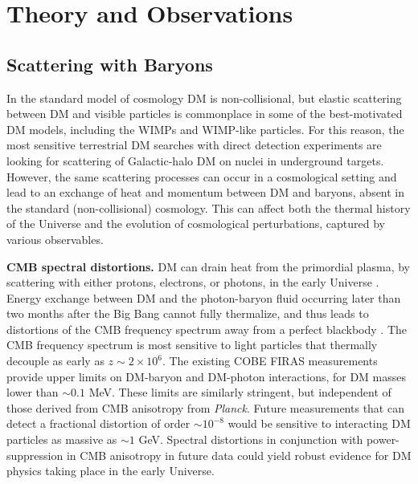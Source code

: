 \documentclass[12pt]{article}
\begin{document}
\section{Theory and Observations}
\label{sec:thobs}
\subsection{Scattering with Baryons}

In the standard model of cosmology DM is non-collisional, but elastic scattering between DM and visible particles is commonplace in some of the best-motivated DM models, including the WIMPs and WIMP-like particles.
For this reason, the most sensitive terrestrial DM searches with direct detection experiments are looking for scattering of Galactic-halo DM on nuclei in underground targets.
However, the same scattering processes can occur in a cosmological setting and lead to an exchange of heat and momentum between DM and baryons, absent in the standard (non-collisional) cosmology. 
This can affect both the thermal history of the Universe and the evolution of cosmological perturbations, captured by various observables.

\textbf{CMB spectral distortions.} 
DM can drain heat from the primordial plasma, by scattering with either protons, electrons, or photons, in the early Universe \cite{AliHaimoud_15}.
Energy exchange between DM and the photon-baryon fluid occurring later than two months after the Big Bang cannot fully thermalize, and thus leads to distortions of the CMB frequency spectrum away from a perfect blackbody \cite{Hu_96,Chluba_13}.  
The CMB frequency spectrum is most sensitive to light particles that thermally decouple as early as $z \sim 2 \times 10^6$.
The existing COBE FIRAS measurements provide upper limits on DM-baryon and DM-photon interactions, for DM masses lower than $\sim 0.1$ MeV. 
These limits are similarly stringent, but independent of those derived from CMB anisotropy from \textit{Planck}.
Future measurements that can detect a fractional distortion of order $\sim 10^{-8}$ would be sensitive to interacting DM particles as massive as $\sim 1$ GeV. 
Spectral distortions in conjunction with power-suppression in CMB anisotropy in future data could yield robust evidence for DM physics taking place in the early Universe.
\end{document}
